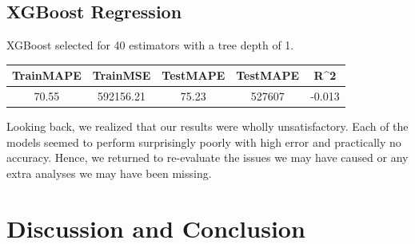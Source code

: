 \documentclass[journal]{IEEEtran}
\begin{document}
\subsection{XGBoost Regression}

\noindent XGBoost selected for 40 estimators with a tree depth of 1.\\

\begingroup
    \medskip
    \centering
    \def\arraystretch{1.5}
        \begin{tabular}{ccccc}
            \toprule
            TrainMAPE & TrainMSE & TestMAPE & TestMAPE & R^2 \\
            \midrule
            70.55 & 592156.21 & 75.23 & 527607 & -0.013\\
            \bottomrule
        \end{tabular}
    \label{table:fifty_runs}
    \medskip
\endgroup


\noindent Looking back, we realized that our results were wholly unsatisfactory. Each of the models seemed to perform surprisingly poorly with high error and practically no accuracy. Hence, we returned to re-evaluate the issues we may have caused or any extra analyses we may have been missing.\\

\section{Discussion and Conclusion}
\printbibliography





\end{document}
